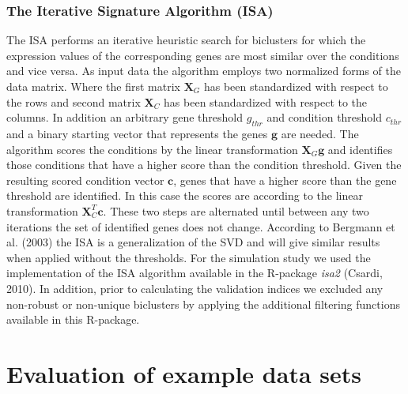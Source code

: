 \subsubsection{The Iterative Signature Algorithm (ISA)}
The ISA performs an iterative heuristic search for biclusters for which the expression values of the corresponding genes are most similar over the conditions and vice versa. As input data the algorithm employs two normalized forms of the data matrix. Where the first matrix $\mathbf{X}_{G}$ has been standardized with respect to the rows and second matrix $\mathbf{X}_{C}$ has been standardized with respect to the columns. In addition an arbitrary gene threshold $g_{thr}$ and condition threshold $c_{thr}$ and a binary starting vector that represents the genes $\mathbf{g}$ are needed.
The algorithm scores the conditions by the linear transformation $\mathbf{X}_{G}\mathbf{g}$ and identifies those conditions that have a higher score than the condition threshold. Given the resulting scored condition vector $\mathbf{c}$, genes that have a higher score than the gene threshold are identified. In this case the scores are according to the linear transformation $\mathbf{X}_{C}^{T}\mathbf{c}$. These two steps are alternated until between any two iterations the set of identified genes does not change. According to Bergmann et al. (2003) the ISA is a generalization of the SVD and will give similar results when applied without the thresholds.
For the simulation study we used the implementation of the ISA algorithm available in the R-package \textit{isa2} (Csardi, 2010). In addition, prior to calculating the validation indices we excluded any non-robust or non-unique biclusters by applying the additional filtering functions available in this R-package.  

\section{Evaluation of example data sets}
